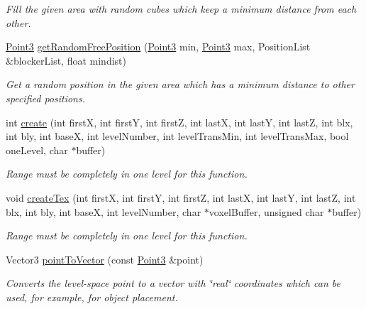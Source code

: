 \begin{DoxyCompactItemize}
\begin{DoxyCompactList}\small\item\em \-Fill the given area with random cubes which keep a minimum distance from each other. \end{DoxyCompactList}\item 
\hypertarget{classLevel_a9055e073da191dce6384fbe5879b754b}{
\hyperlink{classPoint3}{\-Point3} \hyperlink{classLevel_a9055e073da191dce6384fbe5879b754b}{get\-Random\-Free\-Position} (\hyperlink{classPoint3}{\-Point3} min, \hyperlink{classPoint3}{\-Point3} max, \-Position\-List \&blocker\-List, float mindist)}
\label{d2/d9d/classLevel_a9055e073da191dce6384fbe5879b754b}

\begin{DoxyCompactList}\small\item\em \-Get a random position in the given area which has a minimum distance to other specified positions. \end{DoxyCompactList}\item 
\hypertarget{classLevel_a6bd5b177bd5fab4f972f1959ff216ce9}{
int \hyperlink{classLevel_a6bd5b177bd5fab4f972f1959ff216ce9}{create} (int first\-X, int first\-Y, int first\-Z, int last\-X, int last\-Y, int last\-Z, int blx, int bly, int base\-X, int level\-Number, int level\-Trans\-Min, int level\-Trans\-Max, bool one\-Level, char $\ast$buffer)}
\label{d2/d9d/classLevel_a6bd5b177bd5fab4f972f1959ff216ce9}

\begin{DoxyCompactList}\small\item\em \-Range must be completely in one level for this function. \end{DoxyCompactList}\item 
\hypertarget{classLevel_afa588c198e7baad9a59aa4aafcaddc58}{
void \hyperlink{classLevel_afa588c198e7baad9a59aa4aafcaddc58}{create\-Tex} (int first\-X, int first\-Y, int first\-Z, int last\-X, int last\-Y, int last\-Z, int blx, int bly, int base\-X, int level\-Number, char $\ast$voxel\-Buffer, unsigned char $\ast$buffer)}
\label{d2/d9d/classLevel_afa588c198e7baad9a59aa4aafcaddc58}

\begin{DoxyCompactList}\small\item\em \-Range must be completely in one level for this function. \end{DoxyCompactList}\item 
\hypertarget{classLevel_ad26bbcb3c92743de569b8a9558ec2ae4}{
\-Vector3 \hyperlink{classLevel_ad26bbcb3c92743de569b8a9558ec2ae4}{point\-To\-Vector} (const \hyperlink{classPoint3}{\-Point3} \&point)}
\label{d2/d9d/classLevel_ad26bbcb3c92743de569b8a9558ec2ae4}

\begin{DoxyCompactList}\small\item\em \-Converts the level-\/space point to a vector with \char`\"{}real\char`\"{} coordinates which can be used, for example, for object placement. \end{DoxyCompactList}\end{DoxyCompactItemize}
